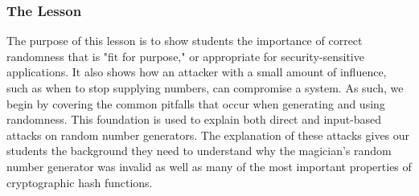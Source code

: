 %

\subsubsection{The Lesson}

The purpose of this lesson is to show students the importance of correct
randomness
that is "fit for purpose," or appropriate for security-sensitive applications.
It also shows how an attacker
with a small amount of influence,
such as when to stop supplying numbers,
can compromise a
system.
As such, we begin by covering the common pitfalls
that occur when generating and
using randomness.
This foundation is used to explain both
direct and input-based attacks on random
number generators.
The explanation of these attacks gives our students the background they need to
understand why the magician's random number generator was invalid as well as
many of the most important properties of cryptographic hash functions.

